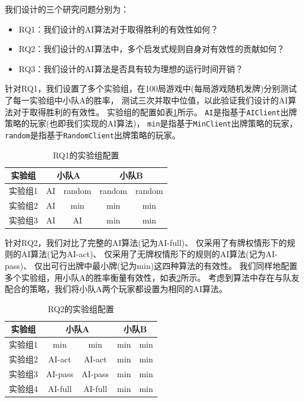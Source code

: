 \documentclass[a4paper]{ctexart}
\begin{document}
我们设计的三个研究问题分别为：
\begin{itemize}
  \item RQ1：我们设计的AI算法对于取得胜利的有效性如何？
  \item RQ2：我们设计的AI算法中，多个启发式规则自身对有效性的贡献如何？
  \item RQ3：我们设计的AI算法是否具有较为理想的运行时间开销？
\end{itemize}

针对RQ1，我们设置了多个实验组，在100局游戏中(每局游戏随机发牌)分别测试了每一实验组中小队A的胜率，
测试三次并取中位值，以此验证我们设计的AI算法对于取得胜利的有效性。
实验组的配置如表\ref{RQ1_config}所示。
\texttt{AI}是指基于\texttt{AIClient}出牌策略的玩家(也即我们实现的AI算法)，
\texttt{min}是指基于\texttt{MinClient}出牌策略的玩家，
\texttt{random}是指基于\texttt{RandomClient}出牌策略的玩家。

\begin{table}
  \centering 
  \caption{RQ1的实验组配置}
  \label{RQ1_config}
  \begin{tabular}{|c|c|c|c|c|}
    \hline
    实验组  & \multicolumn{2}{c|}{小队A} & \multicolumn{2}{c|}{小队B} \\ \hline
    实验组1 & AI & random & random & random \\ \hline
    实验组2 & AI & min & min & min \\ \hline
    实验组3 & AI & AI & min & min \\ \hline
  \end{tabular}
\end{table}

针对RQ2，我们对比了完整的AI算法(记为AI-full)、
仅采用了有牌权情形下的规则的AI算法(记为AI-act)、
仅采用了无牌权情形下的规则的AI算法(记为AI-pass)、
仅出可行出牌中最小牌(记为min)这四种算法的有效性。
我们同样地配置多个实验组，用小队A的胜率衡量有效性，如表\ref{RQ2_config}所示。
考虑到算法中存在与队友配合的策略，我们将小队A两个玩家都设置为相同的AI算法。

\begin{table}
  \centering 
  \caption{RQ2的实验组配置}
  \label{RQ2_config}
  \begin{tabular}{|c|c|c|c|c|}
    \hline
    实验组  & \multicolumn{2}{c|}{小队A} & \multicolumn{2}{c|}{小队B} \\ \hline
    实验组1 & min & min & min & min \\ \hline
    实验组2 & AI-act & AI-act & min & min \\ \hline
    实验组3 & AI-pass & AI-pass & min & min \\ \hline
    实验组4 & AI-full & AI-full & min & min \\ \hline
  \end{tabular}
\end{table}
\end{document}
